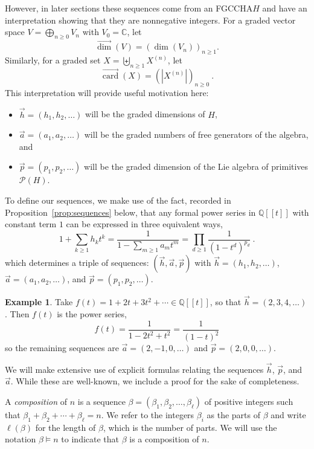\documentclass[11pt]{amsart}
\newcommand{\defncolor}{\color{darkred}}
\newcommand{\defn}[1]{{\defncolor\emph{#1}}} %
\theoremstyle{definition}
\newtheorem{example}[theorem]{Example}
\numberwithin{equation}{section}
\def\CC{{\mathbb C}}
\def\QQ{{\mathbb Q}}
\newcommand{\FGCCHA}{\textsf{FGCCHA}\xspace}
\newcommand{\vecdim}{\overrightarrow{\dim}}
\newcommand{\veccard}{\overrightarrow{\operatorname{card}}}
\begin{document}
However, in later sections these sequences come from an \FGCCHA $H$
and have an interpretation showing that they are nonnegative integers.
For a graded vector space $V = \bigoplus_{n \ge 0} V_{n}$ with $V_{0} = \CC$, let
\[
\vecdim(V) = \left( \dim(V_{n}) \right)_{n \ge 1}.
\]
Similarly, for a graded set $X = \biguplus_{n \ge 1} X^{(n)}$, let
\[
\veccard(X) = \left( |X^{(n)}| \right)_{n \ge 0}~.
\]
This interpretation will provide useful motivation here:
\begin{itemize}
\item $\vec{h} = (h_{1}, h_{2}, \ldots)$ will be the graded dimensions of $H$,

\item $\vec{a} = (a_{1}, a_{2}, \ldots)$ will be the graded numbers of free generators of the algebra, and 

\item $\vec{p} = (p_{1}, p_{2}, \ldots)$ will be the graded dimension of the Lie algebra of primitives $\mathcal{P}(H)$.

\end{itemize}

To define our sequences, we make use of the fact, recorded in Proposition~\ref{prop:sequences}
below, that any formal power series in $\QQ[\![t]\!]$ with constant term $1$
can be expressed in three equivalent ways,
\begin{equation}
\label{eq:gf_relation}
1 + \sum_{k \geq 1} h_k t^k = \frac{1}{1 - \sum_{m \geq 1} a_m t^m} = \prod_{d \geq 1} \frac{1}{(1-t^d)^{p_d}}~.
\end{equation}
which determines a triple of sequences: $(\vec{h}, \vec{a}, \vec{p})$ with $\vec{h} = (h_{1}, h_{2}, \ldots)$, $\vec{a} = (a_{1}, a_{2}, \ldots)$, and $\vec{p} = (p_{1}, p_{2}, \ldots)$.

\begin{example}
Take $f(t) = 1 + 2t + 3 t^{2} + \cdots \in \QQ[\![t]\!]$, so that $\vec{h} = (2, 3, 4, \ldots)$.
Then $f(t)$ is the power series,
\[
f(t) = \frac{1}{1 - 2 t^{2} + t^{2}} = \frac{1}{(1-t)^{2}}
\]
so the remaining sequences are $\vec{a} = (2, -1, 0, \ldots)$ and $\vec{p} = (2, 0, 0, \ldots)$.
\end{example}

We will make extensive use of explicit formulas relating the sequences $\vec{h}$, $\vec{p}$, and $\vec{a}$.  While these are well-known, we include a proof for the sake of completeness.  

A \defn{composition} of $n$ is a sequence $\beta = (\beta_1, \beta_2, \ldots, \beta_\ell)$ of positive integers such that $\beta_{1} + \beta_{2} + \cdots + \beta_{\ell} = n$.  
We refer to the integers $\beta_{i}$ as the parts of $\beta$ and write $\ell(\beta)$ for the length of $\beta$, which is the number of parts.  
We will use the notation $\beta \vDash n$ to indicate that $\beta$ is a composition of $n$.
\end{document}
